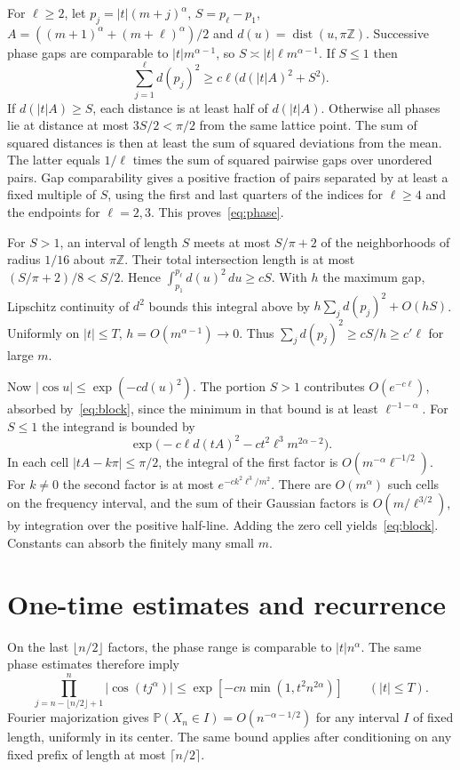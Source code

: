 \documentclass[a4paper,11pt]{amsart}
\DeclareMathOperator{\dist}{dist}
\newcommand{\PP}{\mathbb P}
\begin{document}
For $\ell\ge2$, let $p_j=|t|(m+j)^\alpha$, $S=p_\ell-p_1$, $A=((m+1)^\alpha+(m+\ell)^\alpha)/2$ and $d(u)=\dist(u,\pi\mathbb Z)$. Successive phase gaps are comparable to $|t|m^{\alpha-1}$, so $S\asymp |t|\ell m^{\alpha-1}$. If $S\le1$ then
\begin{equation}\label{eq:phase}
\sum_{j=1}^\ell d(p_j)^2\ge c\ell\bigl(d(|t|A)^2+S^2\bigr).
\end{equation}
If $d(|t|A)\ge S$, each distance is at least half of $d(|t|A)$. Otherwise all phases lie at distance at most $3S/2<\pi/2$ from the same lattice point. The sum of squared distances is then at least the sum of squared deviations from the mean. The latter equals $1/\ell$ times the sum of squared pairwise gaps over unordered pairs. Gap comparability gives a positive fraction of pairs separated by at least a fixed multiple of $S$, using the first and last quarters of the indices for $\ell\ge4$ and the endpoints for $\ell=2,3$. This proves~\eqref{eq:phase}.

For $S>1$, an interval of length $S$ meets at most $S/\pi+2$ of the neighborhoods of radius $1/16$ about $\pi\mathbb Z$. Their total intersection length is at most $(S/\pi+2)/8<S/2$. Hence $\int_{p_1}^{p_\ell}d(u)^2\,du\ge cS$. With $h$ the maximum gap, Lipschitz continuity of $d^2$ bounds this integral above by $h\sum_jd(p_j)^2+O(hS)$. Uniformly on $|t|\le T$, $h=O(m^{\alpha-1})\to0$. Thus $\sum_jd(p_j)^2\ge cS/h\ge c'\ell$ for large $m$.

Now $|\cos u|\le\exp(-c d(u)^2)$. The portion $S>1$ contributes $O(e^{-c\ell})$, absorbed by~\eqref{eq:block}, since the minimum in that bound is at least $\ell^{-1-\alpha}$. For $S\le1$ the integrand is bounded by
\[
 \exp\bigl(-c\ell d(tA)^2-ct^2\ell^3m^{2\alpha-2}\bigr).
\]
In each cell $|tA-k\pi|\le\pi/2$, the integral of the first factor is $O(m^{-\alpha}\ell^{-1/2})$. For $k\ne0$ the second factor is at most $e^{-ck^2\ell^3/m^2}$. There are $O(m^\alpha)$ such cells on the frequency interval, and the sum of their Gaussian factors is $O(m/\ell^{3/2})$, by integration over the positive half-line. Adding the zero cell yields~\eqref{eq:block}. Constants can absorb the finitely many small $m$.

\section{One-time estimates and recurrence}
On the last $\lfloor n/2\rfloor$ factors, the phase range is comparable to $|t|n^\alpha$. The same phase estimates therefore imply
\begin{equation}\label{eq:decay}
\prod_{j=n-\lfloor n/2\rfloor+1}^n |\cos(tj^\alpha)|
\le \exp[-cn\min(1,t^2n^{2\alpha})]
\qquad (|t|\le T).
\end{equation}
Fourier majorization gives $\PP(X_n\in I)=O(n^{-\alpha-1/2})$ for any interval $I$ of fixed length, uniformly in its center. The same bound applies after conditioning on any fixed prefix of length at most $\lceil n/2\rceil$.
\end{document}
